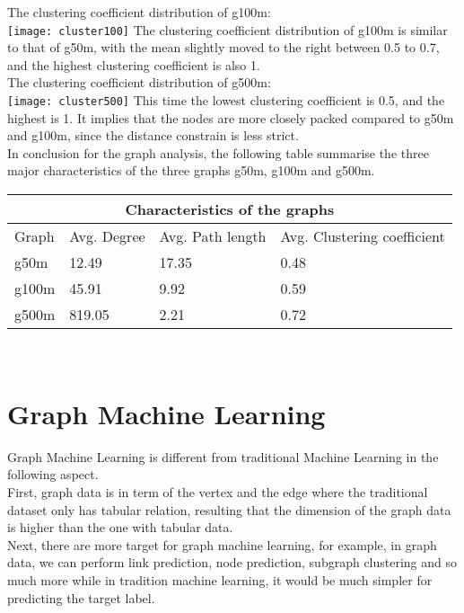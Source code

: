 The clustering coefficient distribution of g100m:\\
\texttt{[image: cluster100]}
The clustering coefficient distribution of g100m is similar to that of g50m, with the mean slightly moved to the right between 0.5 to 0.7, and the highest clustering coefficient is also 1. \\

The clustering coefficient distribution of g500m:\\
\texttt{[image: cluster500]}
This time the lowest clustering coefficient is 0.5, and the highest is 1. It implies that the nodes are more closely packed compared to g50m and g100m, since the distance constrain is less strict. \\

In conclusion for the graph analysis, the following table summarise the three major characteristics of the three graphs g50m, g100m and g500m.\\

\begin{tabular}{ |p{1cm}||p{2cm}|p{2cm}|p{2cm}|  }
 \hline
 \multicolumn{4}{|c|}{Characteristics of the graphs} \\
 \hline
 Graph  & Avg. Degree & Avg. Path length & Avg. Clustering coefficient \\
 \hline
 g50m & 12.49 & 17.35 & 0.48\\
 \hline
 g100m & 45.91 & 9.92 & 0.59\\
 \hline
 g500m & 819.05 & 2.21 & 0.72\\
 \hline
\end{tabular}\\

 \section{Graph Machine Learning}
Graph Machine Learning is different from traditional Machine Learning in the following aspect.\\

First, graph data is in term of the vertex and the edge where the traditional dataset only has tabular relation, resulting that the dimension of the graph data is higher than the one with tabular data.\\

Next, there are more target for graph machine learning, for example, in graph data, we can perform link prediction, node prediction, subgraph clustering and so much more while in tradition machine learning, it would be much simpler for predicting the target label.\\

